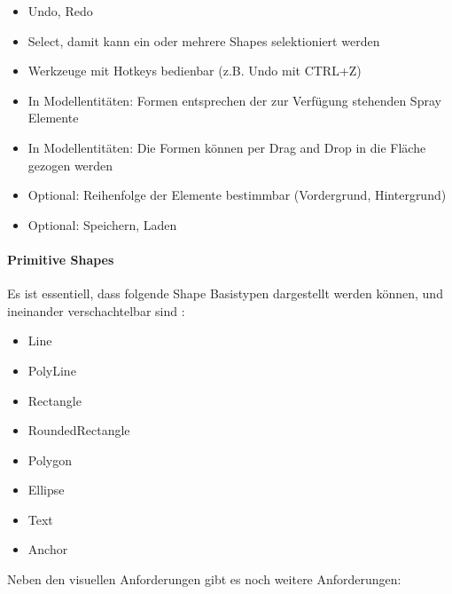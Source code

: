 \begin{itemize}
  \item Undo, Redo
  \item Select,  damit kann ein oder mehrere Shapes selektioniert werden
  \item Werkzeuge mit Hotkeys bedienbar (z.B. Undo mit CTRL+Z)
  \item In Modellentitäten: Formen entsprechen der zur Verfügung stehenden Spray Elemente
  \item In Modellentitäten: Die Formen können per Drag and Drop in die Fläche gezogen werden
  \item Optional: Reihenfolge der Elemente bestimmbar (Vordergrund, Hintergrund)
  \item Optional: Speichern, Laden
\end{itemize}


\paragraph{Primitive Shapes}\label{sec.primitivShapes}

Es ist essentiell, dass folgende Shape Basistypen dargestellt werden können,
und ineinander verschachtelbar sind
\citep[siehe Kapitel \emph{The Shape grammar}][]{sprayUser}:

\begin{itemize}
  \item Line
  \item PolyLine
  \item Rectangle
  \item RoundedRectangle
  \item Polygon
  \item Ellipse
  \item Text
  \item Anchor
\end{itemize}

\noindent Neben den visuellen Anforderungen gibt es noch weitere Anforderungen:


